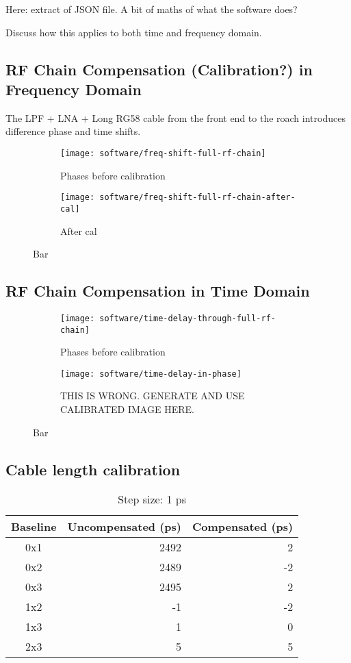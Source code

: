 Here: extract of JSON file.
A bit of maths of what the software does?

Discuss how this applies to both time and frequency domain.

\subsection{RF Chain Compensation (Calibration?) in Frequency Domain}
The LPF + LNA + Long RG58 cable from the front end to the roach introduces difference phase and time shifts. 

\begin{figure}
  \centering
  \begin{subfigure}[b]{0.49\textwidth}
    \centering
    \texttt{[image: software/freq-shift-full-rf-chain]}
    \caption{Phases before calibration}
  \end{subfigure}
  \begin{subfigure}[b]{0.49\textwidth}
    \centering
    \texttt{[image: software/freq-shift-full-rf-chain-after-cal]}
    \caption{After cal}
  \end{subfigure}
  \caption{Bar}
\end{figure}

\subsection{RF Chain Compensation in Time Domain}

\begin{figure}
  \centering
  \begin{subfigure}[b]{0.49\textwidth}
    \centering
    \texttt{[image: software/time-delay-through-full-rf-chain]}
    \caption{Phases before calibration}
  \end{subfigure}
  \begin{subfigure}[b]{0.49\textwidth}
    \centering
    \texttt{[image: software/time-delay-in-phase]}
    \caption{THIS IS WRONG. GENERATE AND USE CALIBRATED IMAGE HERE.}
  \end{subfigure}
  \caption{Bar}
\end{figure}

\subsection{Cable length calibration}
\begin{table}
  \centering
  \begin{tabu}{c|r|r}
    Baseline & Uncompensated (ps)& Compensated (ps)\\
    \hline
    0x1 & 2492 & 2 \\
    0x2 & 2489 & -2 \\
    0x3 & 2495 & 2 \\
    1x2 & -1 & -2 \\
    1x3 & 1  & 0 \\
    2x3 & 5 & 5
  \end{tabu}
  \caption{Step size: 1 ps}
  \label{tab:software-cable-lenth-compensation}
\end{table}
